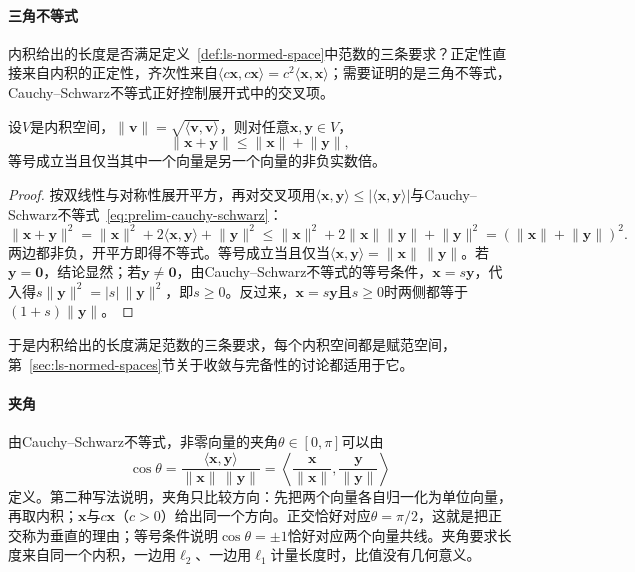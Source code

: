 \paragraph{三角不等式}
内积给出的长度是否满足定义~\ref{def:ls-normed-space}中范数的三条要求？正定性直接来自内积的正定性，齐次性来自$\langle c\bm x,c\bm x\rangle=c^2\langle\bm x,\bm x\rangle$；需要证明的是三角不等式，Cauchy--Schwarz不等式正好控制展开式中的交叉项。
\begin{theorem}[内积诱导长度的三角不等式]
\label{thm:ls-inner-product-triangle}
设$V$是内积空间，$\lVert\bm v\rVert=\sqrt{\langle\bm v,\bm v\rangle}$，则对任意$\bm x,\bm y\in V$，
\[
 \lVert\bm x+\bm y\rVert\leq\lVert\bm x\rVert+\lVert\bm y\rVert,
\]
等号成立当且仅当其中一个向量是另一个向量的非负实数倍。
\end{theorem}
\begin{proof}
按双线性与对称性展开平方，再对交叉项用$\langle\bm x,\bm y\rangle\leq|\langle\bm x,\bm y\rangle|$与Cauchy--Schwarz不等式~\eqref{eq:prelim-cauchy-schwarz}：
\[
 \lVert\bm x+\bm y\rVert^2
 =\lVert\bm x\rVert^2+2\langle\bm x,\bm y\rangle+\lVert\bm y\rVert^2
 \leq\lVert\bm x\rVert^2+2\lVert\bm x\rVert\lVert\bm y\rVert+\lVert\bm y\rVert^2
 =(\lVert\bm x\rVert+\lVert\bm y\rVert)^2.
\]
两边都非负，开平方即得不等式。等号成立当且仅当$\langle\bm x,\bm y\rangle=\lVert\bm x\rVert\,\lVert\bm y\rVert$。若$\bm y=\bm0$，结论显然；若$\bm y\neq\bm0$，由Cauchy--Schwarz不等式的等号条件，$\bm x=s\bm y$，代入得$s\lVert\bm y\rVert^2=|s|\,\lVert\bm y\rVert^2$，即$s\geq0$。反过来，$\bm x=s\bm y$且$s\geq0$时两侧都等于$(1+s)\lVert\bm y\rVert$。
\end{proof}
于是内积给出的长度满足范数的三条要求，每个内积空间都是赋范空间，第~\ref{sec:ls-normed-spaces}节关于收敛与完备性的讨论都适用于它。

\paragraph{夹角}
由Cauchy--Schwarz不等式，非零向量的夹角$\theta\in[0,\pi]$可以由
\[
 \cos\theta=\frac{\langle\bm x,\bm y\rangle}{\lVert\bm x\rVert\,\lVert\bm y\rVert}
 =\left\langle\frac{\bm x}{\lVert\bm x\rVert},\frac{\bm y}{\lVert\bm y\rVert}\right\rangle
\]
定义。第二种写法说明，夹角只比较方向：先把两个向量各自归一化为单位向量，再取内积；$\bm x$与$c\bm x$（$c>0$）给出同一个方向。正交恰好对应$\theta=\pi/2$，这就是把正交称为垂直的理由；等号条件说明$\cos\theta=\pm1$恰好对应两个向量共线。夹角要求长度来自同一个内积，一边用$\ell_2$、一边用$\ell_1$计量长度时，比值没有几何意义。

